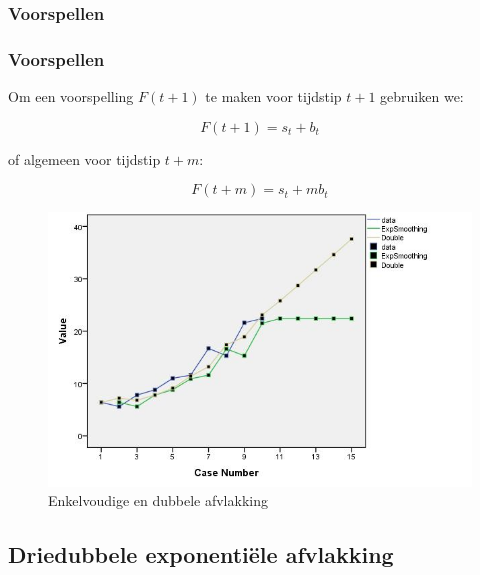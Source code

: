\documentclass{beamer}
\begin{document}
\subsubsection{Voorspellen}

\begin{frame}
  \frametitle{Voorspellen}

  Om een voorspelling $F(t+1)$ te maken voor tijdstip $t+1$ gebruiken we:

  \[ F(t+1) = s_t + b_t \]

  of algemeen voor tijdstip $t+m$:

  \[ F(t+m) = s_t + m b_t \]
\end{frame}

\begin{frame}
  \begin{figure}
    \centering
    \includegraphics[width=\textwidth]{img/tijdreeks71}
    \caption{Enkelvoudige en dubbele afvlakking}
    \label{fig:tijdreeks71}
  \end{figure}
\end{frame}

\subsection{Driedubbele exponentiële afvlakking}
\end{document}

